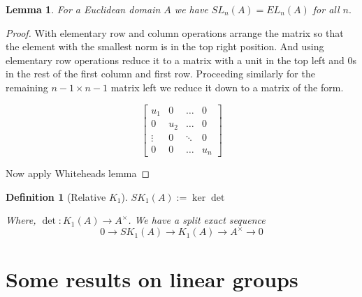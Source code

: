 \documentclass[12pt]{article}
\numberwithin{equation}{section}
\newcounter{dummy} \numberwithin{dummy}{section}
\newtheorem{theorem}[dummy]{Theorem}
\newtheorem{definition}[dummy]{Definition}
\newtheorem{lemma}[dummy]{Lemma}
\begin{document}
	\begin{lemma}
		For a Euclidean domain $A$ we have $SL_n(A)=EL_n(A)$ for all $n.$
	\end{lemma}
	\begin{proof}
		With elementary row and column operations arrange the matrix so that the element with the smallest norm is in the top right position. And using elementary row operations reduce it to a matrix with a unit in the top left and 0s in the rest of the first column and first row. Proceeding similarly for the remaining $n-1 \times n-1 $ matrix left we reduce it down to a matrix of the form.
		
		\[ \begin{bmatrix}
			u_1 & 0 & \dots & 0 \\
			0 & u_2 & \dots & 0 \\
			\vdots & 0 & \ddots & 0\\
			0 & 0 & \dots & u_n 
		\end{bmatrix} \]
		
		Now apply Whiteheads lemma 
	\end{proof}
	
	\begin{definition}[Relative $K_1$]
		$SK_1(A):= \ker \det$
		
		Where, $\det : K_1(A) \to A^\times$. We have a split exact sequence
		\[ 0 \to SK_1(A) \to K_1(A) \to A^\times \to 0 \]
	\end{definition}
	
	
	\section{Some results on linear groups}
	
\end{document}
